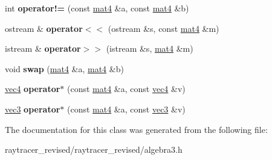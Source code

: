 \begin{DoxyCompactItemize}
\item 
\hypertarget{classmat4_a43bfd79a43b2d40a3afa8f80318325ea}{
int {\bfseries operator!=} (const \hyperlink{classmat4}{mat4} \&a, const \hyperlink{classmat4}{mat4} \&b)}
\label{classmat4_a43bfd79a43b2d40a3afa8f80318325ea}

\item 
\hypertarget{classmat4_a6770d0697c570d83ca121f230bb245fb}{
ostream \& {\bfseries operator$<$$<$} (ostream \&s, const \hyperlink{classmat4}{mat4} \&m)}
\label{classmat4_a6770d0697c570d83ca121f230bb245fb}

\item 
\hypertarget{classmat4_ada4d7d636820b9fc2f2d1ba6fd178b48}{
istream \& {\bfseries operator$>$$>$} (istream \&s, \hyperlink{classmat4}{mat4} \&m)}
\label{classmat4_ada4d7d636820b9fc2f2d1ba6fd178b48}

\item 
\hypertarget{classmat4_af7bc191797f0f9e2eaf21918bfac24f8}{
void {\bfseries swap} (\hyperlink{classmat4}{mat4} \&a, \hyperlink{classmat4}{mat4} \&b)}
\label{classmat4_af7bc191797f0f9e2eaf21918bfac24f8}

\item 
\hypertarget{classmat4_a0252c203e5a77099da7fd04c576ed437}{
\hyperlink{classvec4}{vec4} {\bfseries operator$\ast$} (const \hyperlink{classmat4}{mat4} \&a, const \hyperlink{classvec4}{vec4} \&v)}
\label{classmat4_a0252c203e5a77099da7fd04c576ed437}

\item 
\hypertarget{classmat4_a3a7a7dfc514a58f3c889b48fa4745815}{
\hyperlink{classvec3}{vec3} {\bfseries operator$\ast$} (const \hyperlink{classmat4}{mat4} \&a, const \hyperlink{classvec3}{vec3} \&v)}
\label{classmat4_a3a7a7dfc514a58f3c889b48fa4745815}

\end{DoxyCompactItemize}


The documentation for this class was generated from the following file:\begin{DoxyCompactItemize}
\item 
raytracer\_\-revised/raytracer\_\-revised/algebra3.h\end{DoxyCompactItemize}
